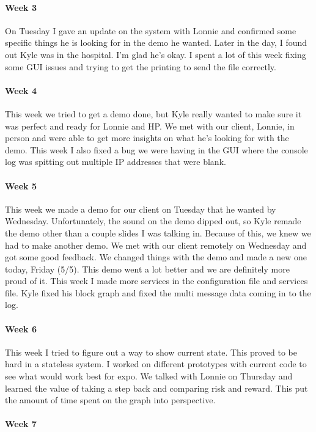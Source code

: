\documentclass[draftclsnofoot, onecolumn, compsoc, 10pt]{IEEEtran}
\begin{document}
\paragraph{Week 3}
On Tuesday I gave an update on the system with Lonnie and confirmed some specific things he is looking for in the demo he wanted. Later in the day, I found out Kyle was in the hospital. I'm glad he's okay. I spent a lot of this week fixing some GUI issues and trying to get the printing to send the file correctly. 
\paragraph{Week 4}
This week we tried to get a demo done, but Kyle really wanted to make sure it was perfect and ready for Lonnie and HP. We met with our client, Lonnie, in person and were able to get more insights on what he's looking for with the demo. This week I also fixed a bug we were having in the GUI where the console log was spitting out multiple IP addresses that were blank.  
\paragraph{Week 5}
This week we made a demo for our client on Tuesday that he wanted by Wednesday. Unfortunately, the sound on the demo dipped out, so Kyle remade the demo other than a couple slides I was talking in. Because of this, we knew we had to make another demo. We met with our client remotely on Wednesday and got some good feedback. We changed things with the demo and made a new one today, Friday (5/5). This demo went a lot better and we are definitely more proud of it. This week I made more services in the configuration file and services file. Kyle fixed his block graph and fixed the multi message data coming in to the log.  
\paragraph{Week 6}
This week I tried to figure out a way to show current state. This proved to be hard in a stateless system. I worked on different prototypes with current code to see what would work best for expo. We talked with Lonnie on Thursday and learned the value of taking a step back and comparing risk and reward. This put the amount of time spent on the graph into perspective.  
\paragraph{Week 7}
\end{document}
